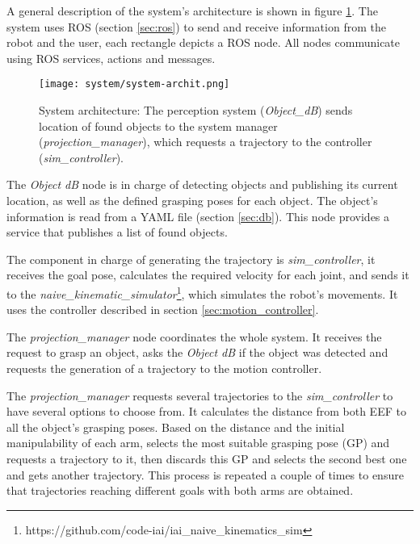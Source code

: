 A general description of the system's architecture is shown in figure \ref{fig:sys_arch}. The system uses ROS (section \ref{sec:ros}) to send and receive information from the robot and the user, each rectangle depicts a ROS node. All nodes communicate using ROS services, actions and messages.

\begin{figure}[H]
	\centering
	\texttt{[image: system/system-archit.png]}
	\vspace{-10pt}
	\caption[System architecture] {System architecture: The perception system (\textit{Object\_dB}) sends location of found objects to the system manager (\textit{projection\_manager}), which requests a trajectory to the controller (\textit{sim\_controller}).}
	\vspace{-15pt}
	\label{fig:sys_arch}
\end{figure}

The \textit{Object dB} node is in charge of detecting objects and publishing its current location, as well as the defined grasping poses for each object. The object's information is read from a YAML file (section \ref{sec:db}). This node provides a service that publishes a list of found objects.

The component in charge of generating the trajectory is \textit{sim\_controller}, it receives the goal pose, calculates the required velocity for each joint, and sends it to the \textit{naive\_kinematic\_simulator}\footnote{https://github.com/code-iai/iai\_naive\_kinematics\_sim}, which simulates the robot's movements. It uses the controller described in section \ref{sec:motion_controller}.

The \textit{projection\_manager} node coordinates the whole system. It receives the request to grasp an object, asks the \textit{Object dB} if the object was detected and requests the generation of a trajectory to the motion controller. 

The \textit{projection\_manager} requests several trajectories to the \textit{sim\_controller} to have several options to choose from. It calculates the distance from both EEF to all the object's grasping poses. Based on the distance and the initial manipulability of each arm, selects the most suitable grasping pose (GP) and requests a trajectory to it, then discards this GP and selects the second best one and gets another trajectory. This process is repeated a couple of times to ensure that trajectories reaching different goals with both arms are obtained.

